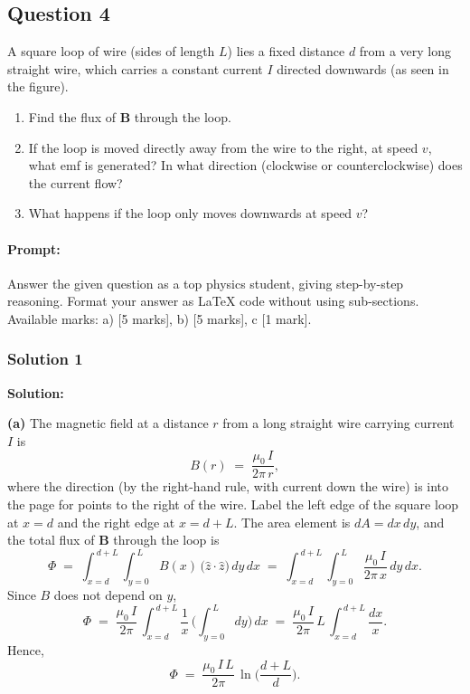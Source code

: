 \documentclass{article}
\begin{document}
\subsection{Question 4}
A square loop of wire (sides of length $L$) lies a fixed distance $d$ from a very long straight wire, which carries a constant current $I$ directed downwards (as seen in the figure).

\begin{enumerate}
    \item[(a)] Find the flux of $\mathbf{B}$ through the loop.
    \item[(b)] If the loop is moved directly away from the wire to the right, at speed $v$, what emf is generated? In what direction (clockwise or counterclockwise) does the current flow?
    \item[(c)] What happens if the loop only moves downwards at speed $v$?
\end{enumerate}


\paragraph{Prompt: \\} 
Answer the given question as a top physics student, giving step-by-step reasoning. Format your answer as LaTeX code without using sub-sections. Available marks: a) [5 marks], b) [5 marks], c [1 mark].

\subsubsection{Solution 1}
\noindent
\textbf{Solution:}

\noindent
\textbf{(a)} The magnetic field at a distance $r$ from a long straight wire carrying current $I$ is
\[
B(r) \;=\; \frac{\mu_0\,I}{2\pi\,r},
\]
where the direction (by the right-hand rule, with current down the wire) is into the page for points to the right of the wire. 
Label the left edge of the square loop at $x=d$ and the right edge at $x=d+L$.  The area element is $dA = dx\,dy$, and the total flux of $\mathbf{B}$ through the loop is
\[
\Phi \;=\; \int_{x=d}^{\,d+L}\int_{y=0}^{\,L} B(x)\,\bigl(\hat{z}\cdot\hat{z}\bigr)\,dy\,dx 
\;=\; \int_{x=d}^{\,d+L}\int_{y=0}^{\,L} \frac{\mu_0\,I}{2\pi\,x}\,dy\,dx.
\]
Since $B$ does not depend on $y$, 
\[
\Phi \;=\; \frac{\mu_0\,I}{2\pi}\,\int_{x=d}^{\,d+L}\!\!\frac{1}{x}\,\bigl(\int_{y=0}^{\,L} dy\bigr)\,dx 
\;=\; \frac{\mu_0\,I}{2\pi}\,L\,\int_{x=d}^{\,d+L}\!\!\frac{dx}{x}.
\]
Hence,
\[
\Phi 
\;=\; \frac{\mu_0\,I\,L}{2\pi}\,\ln\!\biggl(\frac{d+L}{d}\biggr).
\]
\end{document}
